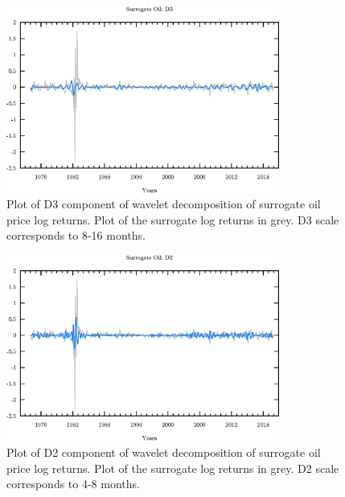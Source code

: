 \begin{figure}
\begin{center}
\includegraphics[width=0.8\textwidth]{./code/plot/surrogate_oil_wr_D3.eps}
\caption{Plot of D3 component of wavelet decomposition of surrogate oil price log returns. 
	Plot of the surrogate log returns in grey. D3 scale corresponds to 8-16 months.}
\end{center}
\label{fig:s-oil-wr-d3}
\end{figure}

\begin{figure}
\begin{center}
\includegraphics[width=0.8\textwidth]{./code/plot/surrogate_oil_wr_D2.eps}
\caption{Plot of D2 component of wavelet decomposition of surrogate oil price log returns. 
	Plot of the surrogate log returns in grey. D2 scale corresponds to 4-8 months.}
\end{center}
\label{fig:s-oil-wr-d2}
\end{figure}

